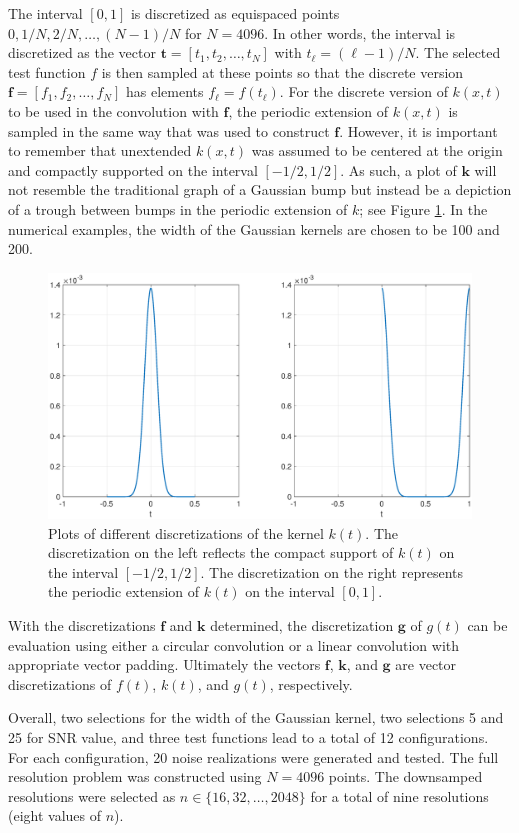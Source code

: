 \documentclass[12pt]{book}
\newcommand{\gVec}{\mathbf{g}}	%
\newcommand{\kVec}{\mathbf{k}}	%
\newcommand{\fVec}{\mathbf{f}}	%
\newcommand{\tVec}{\mathbf{t}}	%
\begin{document}
The interval $[0,1]$ is discretized as equispaced points $0, 1/N, 2/N, \ldots, (N-1)/N$ for $N = 4096$. In other words, the interval is discretized as the vector $\tVec = [t_1,t_2,\ldots,t_N]$ with $t_\ell = (\ell-1)/N$. The selected test function $f$ is then sampled at these points so that the discrete version $\fVec = [f_1,f_2,\ldots,f_N]$ has elements $f_\ell = f(t_\ell)$. For the discrete version of $k(x,t)$ to be used in the convolution with $\fVec$, the periodic extension of $k(x,t)$ is sampled in the same way that was used to construct $\fVec$. However, it is important to remember that unextended $k(x,t)$ was assumed to be centered at the origin and compactly supported on the interval $[-1/2,1/2]$. As such, a plot of $\kVec$ will not resemble the traditional graph of a Gaussian bump but instead be a depiction of a trough between bumps in the periodic extension of $k$; see Figure \ref{RegAndTroughGaussian}. In the numerical examples, the width of the Gaussian kernels are chosen to be 100 and 200.  \par

\begin{figure}
	\centerline{\includegraphics[scale = 0.45]{Figures/RegAndTroughGaussian.eps}}
\caption{Plots of different discretizations of the kernel $k(t)$. The discretization on the left reflects the compact support of $k(t)$ on the interval $[-1/2,1/2]$. The discretization on the right represents the periodic extension of $k(t)$ on the interval $[0,1]$.}
\label{RegAndTroughGaussian}
\end{figure}

With the discretizations $\fVec$ and $\kVec$ determined, the discretization $\gVec$ of $g(t)$ can be evaluation using either a circular convolution or a linear convolution with appropriate vector padding. Ultimately the vectors $\fVec$, $\kVec$, and $\gVec$ are vector discretizations of $f(t)$, $k(t)$, and $g(t)$, respectively. \par
Overall, two selections for the width of the Gaussian kernel, two selections 5 and 25 for SNR value, and three test functions lead to a total of 12 configurations. For each configuration, 20 noise realizations were generated and tested. The full resolution problem was constructed using $N = 4096$ points. The downsamped resolutions were selected as $n \in \{16,32,\ldots,2048\}$ for a total of nine resolutions (eight values of $n$).
\end{document}
